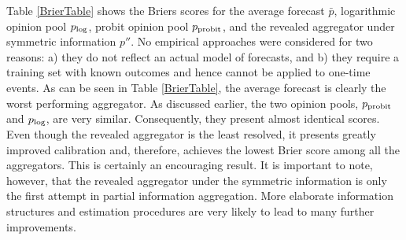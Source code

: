\documentclass[11pt]{article}
\theoremstyle{definition}
\theoremstyle{definition}
\def\probit{p_{\rm probit}}
\def\plog{p_{\rm log}}
\begin{document}
Table \ref{BrierTable} shows the Briers scores for the average forecast $\bar{p}$, logarithmic opinion pool $\plog$, probit opinion pool $\probit$, and the revealed aggregator under symmetric information $p''$. No empirical approaches were considered for two reasons: a) they do not reflect an actual model of forecasts, and b) they require a training set with known outcomes and hence cannot be applied to one-time events. As can be seen in Table \ref{BrierTable}, the average forecast is clearly the worst performing aggregator. As discussed earlier, the two opinion pools, $\probit$ and $\plog$, are very similar. Consequently, they present almost identical scores. Even though the revealed aggregator is the least resolved, it presents greatly improved calibration and, therefore, achieves the lowest Brier score among all the aggregators. This is certainly an encouraging result. It is important to note, however, that the revealed aggregator under the symmetric information is only the first attempt in partial information aggregation. More elaborate information structures and estimation procedures are very likely to lead to many further improvements. 
\end{document}
